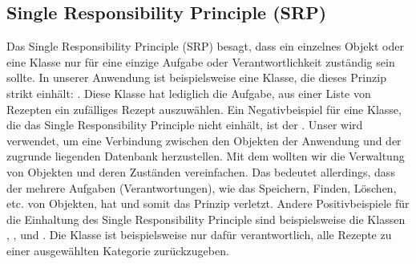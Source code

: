 \subsection{Single Responsibility Principle (SRP)}
Das Single Responsibility Principle (SRP) besagt, dass ein einzelnes Objekt oder eine Klasse nur für eine einzige Aufgabe oder Verantwortlichkeit zuständig sein  sollte.
In unserer Anwendung ist beispielsweise eine Klasse, die dieses Prinzip strikt einhält: \href{https://github.com/MichaelaHaag/RezeptApp/blob/main/1-Adapter/src/main/java/de/rezeptapp/adapter/GUIFunktionen/FunktionenZufallsGenerator.java}{}. Diese Klasse hat lediglich die Aufgabe, aus einer Liste von Rezepten ein \glqq zufälliges\grqq{} Rezept auszuwählen. 
Ein Negativbeispiel für eine Klasse, die das Single Responsibility Principle nicht einhält, ist der \href{https://github.com/MichaelaHaag/RezeptApp/blob/main/1-Adapter/src/main/java/de/rezeptapp/adapter/Datenpersistenz/EntityManager.java}{}. Unser  wird verwendet, um eine Verbindung zwischen den Objekten der Anwendung und der zugrunde liegenden Datenbank herzustellen. Mit dem  wollten wir die Verwaltung von Objekten und deren Zuständen vereinfachen. Das bedeutet allerdings, dass der  mehrere Aufgaben (Verantwortungen), wie das Speichern, Finden, Löschen, etc. von Objekten, hat und somit das Prinzip verletzt. 
Andere Positivbeispiele für die Einhaltung des Single Responsibility Principle sind beispielsweise die Klassen \href{https://github.com/MichaelaHaag/RezeptApp/blob/main/1-Adapter/src/main/java/de/rezeptapp/adapter/GUIFunktionen/FunktionenRezeptBearbeiten.java}{}, \href{https://github.com/MichaelaHaag/RezeptApp/blob/main/1-Adapter/src/main/java/de/rezeptapp/adapter/GUIFunktionen/FunktionenNeuesRezept.java}{}, \href{https://github.com/MichaelaHaag/RezeptApp/blob/main/1-Adapter/src/main/java/de/rezeptapp/adapter/GUIFunktionen/ButtonRenderer.java}{} und \href{https://github.com/MichaelaHaag/RezeptApp/blob/main/1-Adapter/src/main/java/de/rezeptapp/adapter/GUIFunktionen/FunktionenListenÜbersicht.java}{}. Die Klasse  ist beispielsweise nur dafür verantwortlich, alle Rezepte zu einer ausgewählten Kategorie zurückzugeben. 

